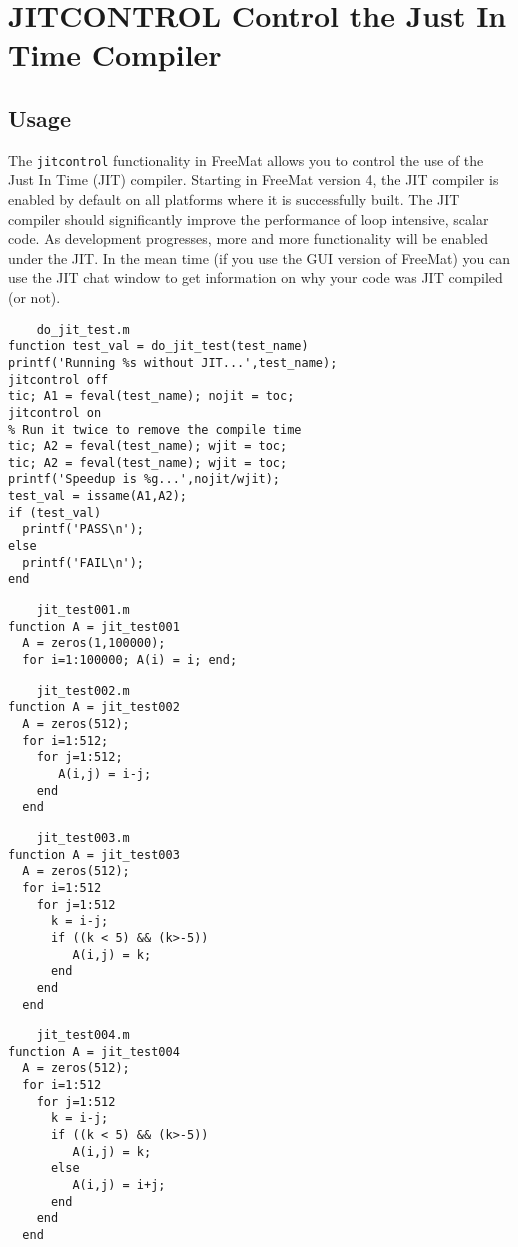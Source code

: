 \section{JITCONTROL Control the Just In Time Compiler}

\subsection{Usage}

The \verb|jitcontrol| functionality in FreeMat allows you to control
the use of the Just In Time (JIT) compiler.  Starting in FreeMat
version 4, the JIT compiler is enabled by default on all platforms
where it is successfully built.  The JIT compiler should significantly
improve the performance of loop intensive, scalar code.  As development
progresses, more and more functionality will be enabled under the JIT.
In the mean time (if you use the GUI version of FreeMat) you can use
the JIT chat window to get information on why your code was JIT compiled
(or not).
\begin{verbatim}
    do_jit_test.m
function test_val = do_jit_test(test_name)
printf('Running %s without JIT...',test_name);
jitcontrol off
tic; A1 = feval(test_name); nojit = toc;
jitcontrol on
% Run it twice to remove the compile time
tic; A2 = feval(test_name); wjit = toc;
tic; A2 = feval(test_name); wjit = toc;
printf('Speedup is %g...',nojit/wjit);
test_val = issame(A1,A2);
if (test_val)
  printf('PASS\n');
else
  printf('FAIL\n');
end
\end{verbatim}
\begin{verbatim}
    jit_test001.m
function A = jit_test001
  A = zeros(1,100000);
  for i=1:100000; A(i) = i; end;
\end{verbatim}
\begin{verbatim}
    jit_test002.m
function A = jit_test002
  A = zeros(512);
  for i=1:512;
    for j=1:512;
       A(i,j) = i-j;
    end
  end
\end{verbatim}
\begin{verbatim}
    jit_test003.m
function A = jit_test003
  A = zeros(512);
  for i=1:512
    for j=1:512
      k = i-j;
      if ((k < 5) && (k>-5))
         A(i,j) = k;
      end
    end
  end
\end{verbatim}
\begin{verbatim}
    jit_test004.m
function A = jit_test004
  A = zeros(512);
  for i=1:512
    for j=1:512
      k = i-j;
      if ((k < 5) && (k>-5))
         A(i,j) = k;
      else
         A(i,j) = i+j;
      end
    end
  end
\end{verbatim}
